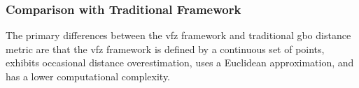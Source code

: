 \documentclass[final,twocolumn,12pt]{elsarticle}
\begin{document}
	
	\subsubsection{Comparison with Traditional  Framework} \label{sec:methods:framework:compare}

	The primary differences between the \gls{vfz} framework and traditional \gls{gbo} distance metric are that the \gls{vfz} framework is defined by a continuous set of points, exhibits occasional distance overestimation, uses a Euclidean approximation, and has a lower computational complexity.
	
\end{document}
